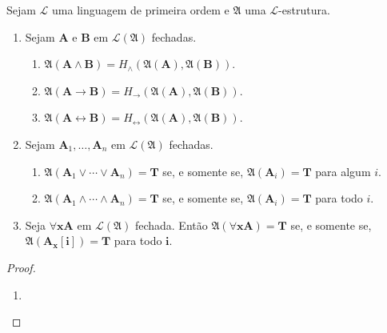 \begin{proposition}
    Sejam $\mathcal{L}$ uma linguagem de primeira ordem e $\mathfrak{A}$ uma $\mathcal{L}$-estrutura.
        \begin{enumerate}[leftmargin=*, align=left, label=\textbf{(\alph*)}]
            \item Sejam $\mathbf{A}$ e $\mathbf{B}$ em $\mathcal{L}(\mathfrak{A})$ fechadas.
                \begin{enumerate}[label=\roman*.]
                    \item $\mathfrak{A}(\mathbf{A} \land \mathbf{B}) = H_{\land}(\mathfrak{A}(\mathbf{A}), \mathfrak{A}(\mathbf{B}))$.
                    \item $\mathfrak{A}(\mathbf{A} \rightarrow \mathbf{B}) = H_{\rightarrow}(\mathfrak{A}(\mathbf{A}), \mathfrak{A}(\mathbf{B}))$.
                    \item $\mathfrak{A}(\mathbf{A} \leftrightarrow \mathbf{B}) = H_{\leftrightarrow}(\mathfrak{A}(\mathbf{A}), \mathfrak{A}(\mathbf{B}))$.
                \end{enumerate}
            \item Sejam $\mathbf{A}_1, \ldots,\mathbf{A}_n$ em $\mathcal{L}(\mathfrak{A})$ fechadas.
                \begin{enumerate}[label=\roman*.]
                    \item $\mathfrak{A}(\mathbf{A}_1 \lor \cdots \lor \mathbf{A}_n) = \mathbf{T}$ se, e somente se, $\mathfrak{A}(\mathbf{A}_i) = \mathbf{T}$ para algum $i$.
                    \item $\mathfrak{A}(\mathbf{A}_1 \land \cdots \land \mathbf{A}_n) = \mathbf{T}$ se, e somente se, $\mathfrak{A}(\mathbf{A}_i) = \mathbf{T}$ para todo $i$.
                \end{enumerate}
            \item Seja $\forall \mathbf{x} \mathbf{A}$ em $\mathcal{L}(\mathfrak{A})$ fechada. Então $\mathfrak{A}(\forall \mathbf{x} \mathbf{A}) = \mathbf{T}$ se, e somente se, $\mathfrak{A}(\mathbf{A}_{\mathbf{x}}[\mathbf{i}]) = \mathbf{T}$ para todo $\mathbf{i}$.
        \end{enumerate}
\end{proposition}

\begin{proof}
    \leavevmode
        \begin{enumerate}[leftmargin=*, align=left, label=\textbf{(\alph*)}]
            \item 
        \end{enumerate}
\end{proof}

